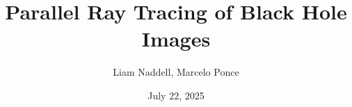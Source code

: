 

\title{Parallel Ray Tracing of Black Hole Images}
\author[L.Naddell \& M.Ponce (CMS/UTSC)]{Liam Naddell, Marcelo Ponce}
\date[PEARC'25 - July 2025]{July 22, 2025}




\begin{frame}
  \titlepage
\end{frame}




